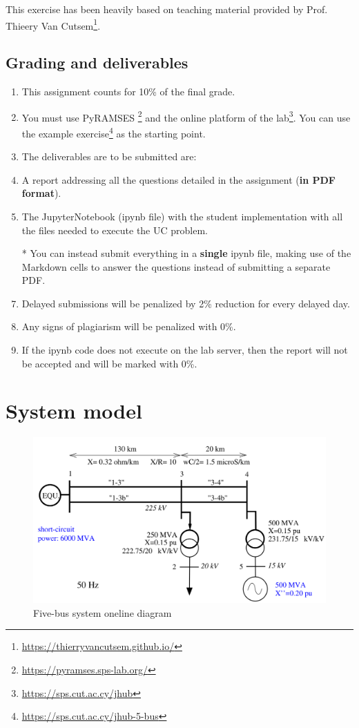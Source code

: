 \documentclass[a4paper,11pt,oneside,onecolumn]{article}
\begin{document}
This exercise has been heavily based on teaching material provided by Prof. Thieery Van Cutsem\footnote{\url{https://thierryvancutsem.github.io/}}.

\subsection{Grading and deliverables}

\begin{enumerate}
	\item This assignment counts for 10\% of the final grade.
	\item You must use PyRAMSES \footnote{\url{https://pyramses.sps-lab.org/}} and the online platform of the lab\footnote{\url{https://sps.cut.ac.cy/jhub}}. You can use the example exercise\footnote{\url{https://sps.cut.ac.cy/jhub-5-bus}} as the starting point.
	\item The deliverables are to be submitted are:
	\begenu
	\item A report addressing all the questions detailed in the assignment (\textbf{in PDF format}).
	\item The JupyterNotebook (ipynb file) with the student implementation with all the files needed to execute the UC problem.
	\item[*] You can instead submit everything in a \textbf{single} ipynb file, making use of the Markdown cells to answer the questions instead of submitting a separate PDF.
	\endenu
	\item Delayed submissions will be penalized by 2\% reduction for every delayed day.
	\item Any signs of plagiarism will be penalized with 0\%.
	\item If the ipynb code does not execute on the lab server, then the report will not be accepted and will be marked with 0\%.
\end{enumerate}

\section{System model}

\begin{figure}[H]
	\centering
	\includegraphics[width=\linewidth]{model}
	\caption{Five-bus system oneline diagram}
	\label{fig:model}
\end{figure}
\end{document}
